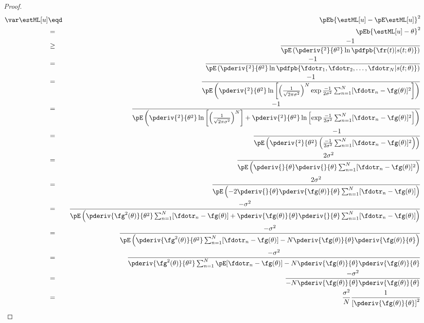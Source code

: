\begin{proof}
\begin{eqnarray*}
   \var\estML[u] 
     &\eqd& \pEb{\estML[u]-\pE\estML[u]}^2
   \\&=& \pEb{\estML[u]-\theta}^2
   \\&\ge& \frac{-1}{\pE\left(
              \pderiv{^2}{\theta^2} \ln \pdfpb{\fr(t)|s(t;\theta)}
           \right)}
   \\&=&   \frac{-1}{\pE\left(
              \pderiv{^2}{\theta^2} \ln 
              \pdfpb{\fdotr_1, \fdotr_2,\ldots,\fdotr_N|s(t;\theta)}
           \right)}
   \\&=&   \frac{-1}{\pE\left(
              \pderiv{^2}{\theta^2} \ln\left[ 
              \left(\frac{1}{\sqrt{2\pi\sigma^2}} \right)^N 
              \exp{\frac{-1}{2\sigma^2}\sum_{n=1}^N [\fdotr_n-\fg(\theta)]^2 }\right]
           \right)}
   \\&=&   \frac{-1}{\pE\left(
              \pderiv{^2}{\theta^2} \ln\left[ 
              \left(\frac{1}{\sqrt{2\pi\sigma^2}} \right)^N \right]
              +
              \pderiv{^2}{\theta^2} \ln\left[ 
              \exp{\frac{-1}{2\sigma^2}\sum_{n=1}^N [\fdotr_n-\fg(\theta)]^2 }\right]
           \right)}
  \\&=&   \frac{-1}{\pE\left(
             \pderiv{^2}{\theta^2} 
             \left(\frac{-1}{2\sigma^2}\sum_{n=1}^N [\fdotr_n-\fg(\theta)]^2 \right)
          \right)}
  \\&=&   \frac{2\sigma^2}{\pE\left(
             \pderiv{}{\theta} \pderiv{}{\theta} 
             \sum_{n=1}^N [\fdotr_n-\fg(\theta)]^2 
          \right)}
  \\&=&   \frac{2\sigma^2}{\pE\left(
             -2\pderiv{}{\theta} 
             \pderiv{\fg(\theta)}{\theta}
             \sum_{n=1}^N [\fdotr_n-\fg(\theta)] 
          \right)}
  \\&=&   \frac{-\sigma^2}{\pE\left(
             \pderiv{\fg^2(\theta)}{\theta^2}
             \sum_{n=1}^N [\fdotr_n-\fg(\theta)] 
             +
             \pderiv{\fg(\theta)}{\theta}
             \pderiv{}{\theta}
             \sum_{n=1}^N [\fdotr_n-\fg(\theta)] 
          \right)}
   \\&=&   \frac{-\sigma^2}{\pE\left(
              \pderiv{\fg^2(\theta)}{\theta^2}
              \sum_{n=1}^N [\fdotr_n-\fg(\theta)] 
              -N
              \pderiv{\fg(\theta)}{\theta}
              \pderiv{\fg(\theta)}{\theta}
           \right)}
   \\&=&   \frac{-\sigma^2}{
              \pderiv{\fg^2(\theta)}{\theta^2}
              \sum_{n=1}^N \pE[\fdotr_n-\fg(\theta)] 
              -N
              \pderiv{\fg(\theta)}{\theta}
              \pderiv{\fg(\theta)}{\theta}
           }
   \\&=&   \frac{-\sigma^2}{
              -N
              \pderiv{\fg(\theta)}{\theta}
              \pderiv{\fg(\theta)}{\theta}
           }
   \\&=&   \frac{\sigma^2}{N}
           \frac{1}{\left[ \pderiv{\fg(\theta)}{\theta} \right]^2}
\end{eqnarray*}


\end{proof}
